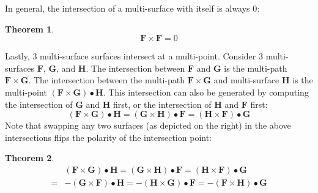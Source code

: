 \documentclass{book}
\newtheorem{thm}{Theorem}
\begin{document}
In general, the intersection of a multi-surface with itself is always \(0\):

\begin{thm}
\[\mathbf{F} \times \mathbf{F} = 0\]
\end{thm}


Lastly, 3 multi-surface surfaces intersect at a multi-point. Consider \(3\) multi-surfaces \(\mathbf{F}\), \(\mathbf{G}\), and \(\mathbf{H}\). The intersection between \(\mathbf{F}\) and \(\mathbf{G}\) is the multi-path \(\mathbf{F} \times \mathbf{G}\). The intersection between the multi-path \(\mathbf{F} \times \mathbf{G}\) and multi-surface \(\mathbf{H}\) is the multi-point \((\mathbf{F} \times \mathbf{G}) \bullet \mathbf{H}\). This intersection can also be generated by computing the intersection of \(\mathbf{G}\) and \(\mathbf{H}\) first, or the intersection of \(\mathbf{H}\) and \(\mathbf{F}\) first:
\[(\mathbf{F} \times \mathbf{G}) \bullet \mathbf{H} = (\mathbf{G} \times \mathbf{H}) \bullet \mathbf{F} = (\mathbf{H} \times \mathbf{F}) \bullet \mathbf{G}\]
Note that swapping any two surfaces (as depicted on the right) in the above intersections flips the polarity of the intersection point:
\begin{thm}
\begin{align*}
& (\mathbf{F} \times \mathbf{G}) \bullet \mathbf{H} = (\mathbf{G} \times \mathbf{H}) \bullet \mathbf{F} = (\mathbf{H} \times \mathbf{F}) \bullet \mathbf{G} \\ 
= & -(\mathbf{G} \times \mathbf{F}) \bullet \mathbf{H} = -(\mathbf{H} \times \mathbf{G}) \bullet \mathbf{F} = -(\mathbf{F} \times \mathbf{H}) \bullet \mathbf{G}
\end{align*}
\end{thm}
\end{document}
